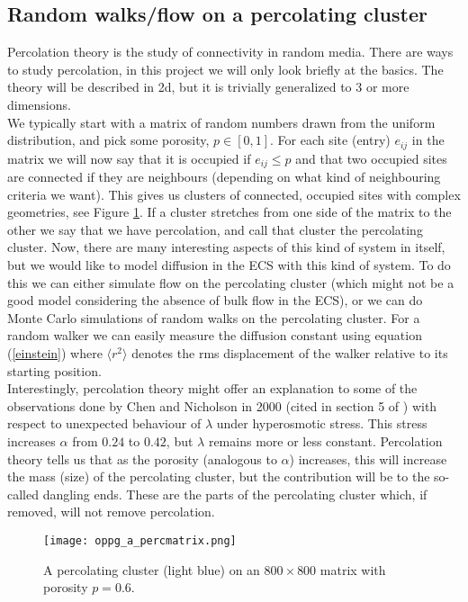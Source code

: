 \documentclass[a4paper,english, 12pt, twoside]{article}
\begin{document}
\subsection{Random walks/flow on a percolating cluster}
Percolation theory is the study of connectivity in random media. There are ways to study percolation, in this project we will only look briefly at the basics. The theory will be described in 2d, but it is trivially generalized to 3 or more dimensions.\\
We typically start with a matrix of random numbers drawn from the uniform distribution, and pick some porosity, $p\in[0,1]$. 
For each site (entry) $e_{ij}$ in the matrix we will now say that it is occupied if $e_{ij} \leq p$ and that two occupied sites are connected if they are neighbours (depending on what kind of neighbouring criteria we want). 
This gives us clusters of connected, occupied sites with complex geometries, see Figure \ref{perc}. 
If a cluster stretches from one side of the matrix to the other we say that we have percolation, and call that cluster the percolating cluster. 
Now, there are many interesting aspects of this kind of system in itself, but we would like to model diffusion in the ECS with this kind of system. 
To do this we can either simulate flow on the percolating cluster (which might not be a good model considering the absence of bulk flow in the ECS), or we can do Monte Carlo simulations of random walks on the percolating cluster. 
For a random walker we can easily measure the diffusion constant using equation (\ref{einstein}) where $\langle r^2\rangle$ denotes the rms displacement of the walker relative to its starting position. \\
Interestingly, percolation theory might offer an explanation to some of the observations done by Chen and Nicholson in 2000 (cited in section 5 of \cite{hrabetova2004contribution}) with respect to unexpected behaviour of $\lambda$ under hyperosmotic stress. 
This stress increases $\alpha$ from $0.24$ to $0.42$, but $\lambda$ remains more or less constant. 
Percolation theory tells us that as the porosity (analogous to $\alpha$) increases, this will increase the mass (size) of the percolating cluster, but the contribution will be to the so-called dangling ends. These are the parts of the percolating cluster which, if removed, will not remove percolation.

\begin{figure}[H]
 \centering
 \texttt{[image: oppg\_a\_percmatrix.png]}
 \caption{A percolating cluster (light blue) on an $800\times800$ matrix with porosity $p=0.6$.}
 \label{perc}
\end{figure}
\end{document}
